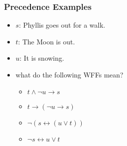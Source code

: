 \documentclass[dvipsnames]{beamer}
\begin{document}
\begin{frame}
  \frametitle{Precedence Examples}

  \begin{example}
    \begin{itemize}
      \item $s$: Phyllis goes out for a walk.
      \item $t$: The Moon is out.
      \item $u$: It is snowing.
    \end{itemize}

    \medskip
    \begin{itemize}
      \item what do the following WFFs mean?

      \pause
      \begin{itemize}
        \item $t \wedge \neg u \rightarrow s$
        \pause
        \item $t \rightarrow (\neg u \rightarrow s)$
        \pause
        \item $\neg (s \leftrightarrow (u \vee t))$
        \pause
        \item $\neg s \leftrightarrow u \vee t$
      \end{itemize}
    \end{itemize}
  \end{example}
\end{frame}
\end{document}
